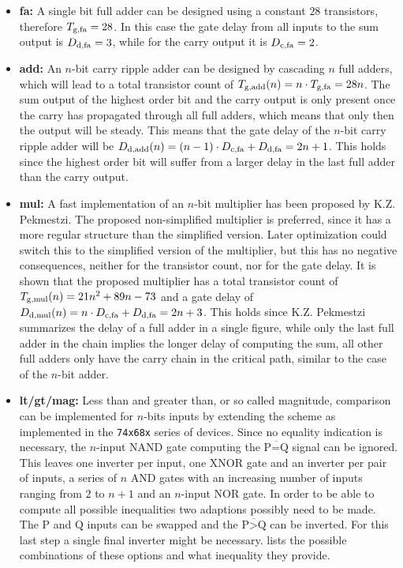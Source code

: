 \documentclass[a4paper, 9pt, conference, onecolumn]{ieeeconf}
\newcommand{\bfit}[1]{\item{\bf #1:}}
\newcommand{\ifnn}[1]{\if\relax\detokenize{#1}\relax\else}
\newcommand{\f}[3]{#1_{\text{\ifnn{#2}#2,\fi#3}}}
\newcommand{\signal}[1]{\texttt{$\text{#1}$}}
\newcommand{\signali}[1]{\texttt{$\overline{\text{#1}}$}}
\begin{document}
\begin{itemize}
  \bfit{fa}
    A single bit full adder can be designed using a constant $28$ transistors\cite[Figure 11.4(b)]{Weste:2010:CVD:1841628}, therefore $\f{T}{g}{fa} = 28$. In this case the gate delay from all inputs to the sum output is $\f{D}{d}{fa} = 3$, while for the carry output it is $\f{D}{c}{fa} = 2$.
  \bfit{add}
    An $n$-bit carry ripple adder can be designed by cascading $n$ full adders\cite[Section 11.2.2.1]{Weste:2010:CVD:1841628}, which will lead to a total transistor count of $\f{T}{g}{add}(n) = n \cdot \f{T}{g}{fa} = 28n$. The sum output of the highest order bit and the carry output is only present once the carry has propagated through all full adders, which means that only then the output will be steady. This means that the gate delay of the $n$-bit carry ripple adder will be $\f{D}{d}{add}(n) = (n - 1) \cdot \f{D}{c}{fa} + \f{D}{d}{fa} = 2n + 1$. This holds since the highest order bit will suffer from a larger delay in the last full adder than the carry output.
  \bfit{mul}
    A fast implementation of an $n$-bit multiplier has been proposed by K.Z. Pekmestzi\cite{743408}. The proposed non-simplified multiplier is preferred, since it has a more regular structure than the simplified version. Later optimization could switch this to the simplified version of the multiplier, but this has no negative consequences, neither for the transistor count, nor for the gate delay. It is shown that the proposed multiplier has a total transistor count of $\f{T}{g}{mul}(n) = 21n^{2} + 89n - 73$ and a gate delay of $\f{D}{d}{mul}(n) = n \cdot \f{D}{c}{fa} + \f{D}{d}{fa} = 2n + 3$. This holds since K.Z. Pekmestzi summarizes the delay of a full adder in a single figure, while only the last full adder in the chain implies the longer delay of computing the sum, all other full adders only have the carry chain in the critical path, similar to the case of the $n$-bit adder.
  \bfit{lt/gt/mag}
    Less than and greater than, or so called magnitude, comparison can be implemented for $n$-bits inputs by extending the scheme as implemented in the \texttt{74x68x} series of devices\cite[p. 4]{74x682}. Since no equality indication is necessary, the $n$-input NAND gate computing the \signali{P=Q} signal can be ignored. This leaves one inverter per input, one XNOR gate and an inverter per pair of inputs, a series of $n$ AND gates with an increasing number of inputs ranging from $2$ to $n + 1$ and an $n$-input NOR gate. In order to be able to compute all possible inequalities two adaptions possibly need to be made. The \signal{P} and \signal{Q} inputs can be swapped and the \signali{P>Q} can be inverted. For this last step a single final inverter might be necessary.  lists the possible combinations of these options and what inequality they provide.

\end{itemize}
\end{document}

